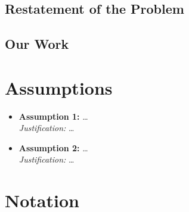 \documentclass[12pt, letterpaper]{article}
\begin{document}
\subsection{Restatement of the Problem}

\subsection{Our Work}

\section{Assumptions}

\begin{itemize}
    \item \textbf{Assumption 1:} \dots
    \\ \textit{Justification:} \dots
    \item \textbf{Assumption 2:} \dots
    \\ \textit{Justification:} \dots
\end{itemize}

\section{Notation}
\end{document}
